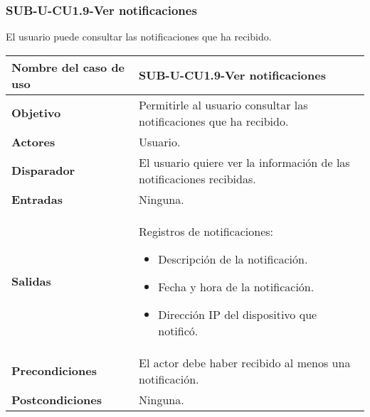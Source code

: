 
\subsubsection{SUB-U-CU1.9-Ver notificaciones}\label{SUB-U-CU1.9}
El usuario puede consultar las notificaciones que ha recibido.%

\begin{longtable}{|J{5cm}|J{10.3cm}|}
	\hline
	\textbf{Nombre del caso de uso} &
		SUB-U-CU1.9-Ver notificaciones \\ \hline
	\textbf{Objetivo} &
		Permitirle al usuario consultar las notificaciones que ha recibido. \\ \hline
	\textbf{Actores} &
		Usuario. \\ \hline 
	\textbf{Disparador} & 
		 El usuario quiere ver la información de las notificaciones recibidas.
		 \\ \hline 
	\textbf{Entradas} & Ninguna.
		\\ \hline 
	\textbf{Salidas} & 
	    Registros de notificaciones:
		\begin{itemize}
			\item Descripción de la notificación.
			\item Fecha y hora de la notificación.
			\item Dirección IP del dispositivo que notificó.
		\end{itemize} 
		\\ \hline
	\textbf{Precondiciones} &
		El actor debe haber recibido al menos una notificación.\\ \hline
	\textbf{Postcondiciones} & Ninguna.

\end{longtable}
